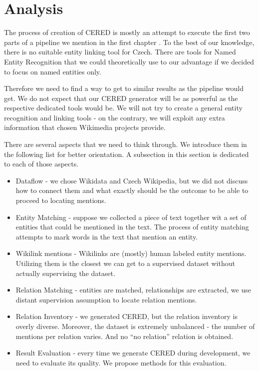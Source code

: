 \section{Analysis}

The process of creation of CERED is mostly an attempt to execute the first two parts of a pipeline we mention in the first chapter . To the best of our knowledge, there is no suitable entity linking tool for Czech. There are tools for Named Entity Recognition that we could theoretically use to our advantage if we decided to focus on named entities only.

Therefore we need to find a way to get to similar results as the pipeline would get. We do not expect that our CERED generator will be as powerful as the respective dedicated tools would be. We will not try to create a general entity recognition and linking tools - on the contrary, we will exploit any extra information that chosen Wikimedia projects provide.

There are several aspects that we need to think through. We introduce them in the following list for better orientation. A subsection in this section is dedicated to each of those aspects. 
\begin{itemize}
 \item  Dataflow - we chose Wikidata and Czech Wikipedia, but we did not discuss how to connect them and what exactly should be the outcome to be able to proceed to locating mentions.
 \item  Entity Matching - suppose we collected a piece of text together wit a set of entities that could be mentioned in the text. The process of entity matching attempts to mark words in the text that mention an entity.
 \item  Wikilink mentions - Wikilinks are (mostly) human labeled entity mentions. Utilizing them is the closest we can get to a supervised dataset without actually supervising the dataset.
 \item  Relation Matching - entities are matched, relationships are extracted, we use distant supervision assumption to locate relation mentions.
\item Relation Inventory - we generated CERED, but the relation inventory is overly diverse. Moreover, the dataset is extremely unbalanced - the number of mentions per relation varies. And no “no relation” relation is obtained.
 \item  Result Evaluation - every time we generate CERED during development, we need to evaluate its quality. We propose methods for this evaluation. 
\end{itemize}



